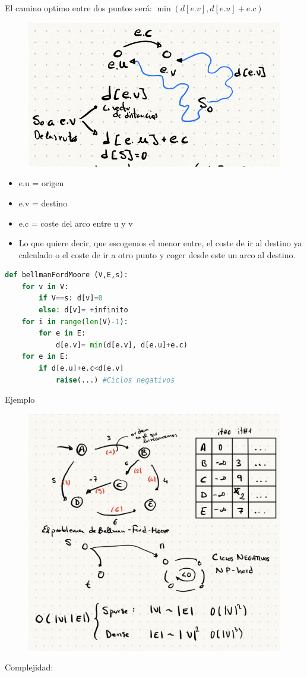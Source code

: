 \documentclass[12pt, twoside, openright]{report} %
\begin{document}
El camino optimo entre dos puntos será: \(\min (d[e.v], d[e.u]+ e.c)\)
\begin{figure}[H]
	{\includegraphics[scale=.32]{Untitled 25.png}}
\end{figure}
\begin{itemize}
\item
  e.u = origen
\item
  e.v = destino
\item
  e.c = coste del arco entre u y v
\item
    Lo que quiere decir, que escogemos el menor entre, el coste de ir al
    destino ya calculado o el coste de ir a otro punto y coger desde
    este un arco al destino.
\end{itemize}
\begin{lstlisting}[language=Python]
def bellmanFordMoore (V,E,s):
	for v in V:
		if V==s: d[v]=0
		else: d[v]= +infinito
	for i in range(len(V)-1):
		for e in E:
			d[e.v]= min(d[e.v], d[e.u]+e.c)
	for e in E:
		if d[e.u]+e.c<d[e.v]
			raise(...) #Ciclos negativos
\end{lstlisting}

\pagebreak
Ejemplo
\begin{figure}[H]
	{\includegraphics[scale=.3]{Untitled 26.png}}
\end{figure}
Complejidad:
\end{document}

